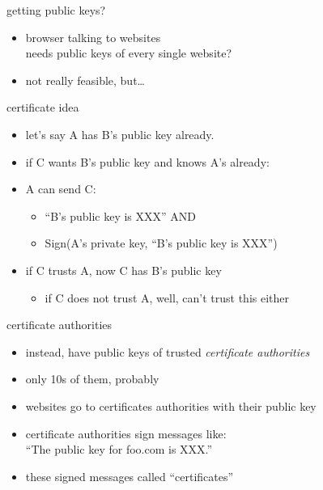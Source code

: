 \begin{frame}{getting public keys?}
    \begin{itemize}
    \item browser talking to websites \\
    needs public keys of every single website?
    \vspace{.5cm}
    \item not really feasible, but\ldots
    \end{itemize}
\end{frame}

\begin{frame}{certificate idea}
    \begin{itemize}
        \item let's say A has B's public key already.
        \item if C wants B's public key and knows A's already:
            \vspace{.5cm}
        \item A can send C:
            \begin{itemize}
            \item ``B's public key is XXX'' AND
            \item Sign(A's private key, ``B's public key is XXX'')
            \end{itemize}
        \item if C trusts A, now C has B's public key
            \begin{itemize}
            \item if C does not trust A, well, can't trust this either
            \end{itemize}
    \end{itemize}
\end{frame}

\begin{frame}{certificate authorities}
    \begin{itemize}
    \item instead, have public keys of trusted \textit{certificate authorities}
    \item only 10s of them, probably
    \vspace{.5cm}
    \item websites go to certificates authorities with their public key
    \item certificate authorities sign messages like: \\
        ``The public key for foo.com is XXX.''
    \item these signed messages called ``certificates''
    \end{itemize}
\end{frame}

